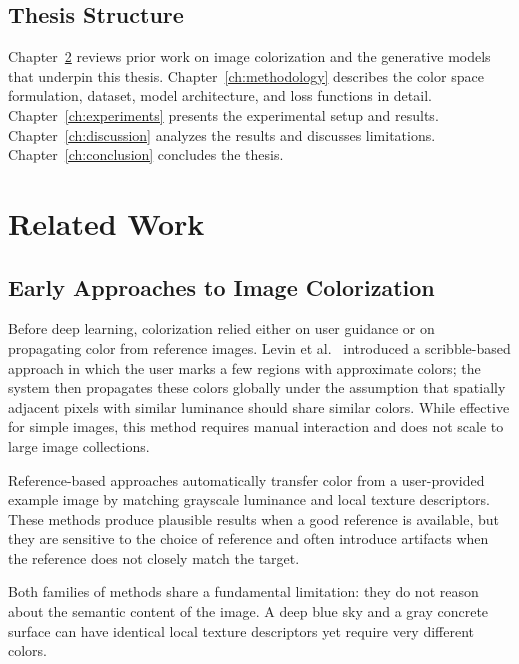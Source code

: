 \documentclass[12pt, a4paper, oneside]{report}
\begin{document}
\section{Thesis Structure}

Chapter~\ref{ch:related} reviews prior work on image colorization and the
generative models that underpin this thesis. Chapter~\ref{ch:methodology} describes
the color space formulation, dataset, model architecture, and loss functions in
detail. Chapter~\ref{ch:experiments} presents the experimental setup and results.
Chapter~\ref{ch:discussion} analyzes the results and discusses limitations.
Chapter~\ref{ch:conclusion} concludes the thesis.


\chapter{Related Work}
\label{ch:related}

\section{Early Approaches to Image Colorization}

Before deep learning, colorization relied either on user guidance or on propagating
color from reference images. Levin et al.\ \cite{levin2004colorization} introduced
a scribble-based approach in which the user marks a few regions with approximate
colors; the system then propagates these colors globally under the assumption that
spatially adjacent pixels with similar luminance should share similar colors. While
effective for simple images, this method requires manual interaction and does not
scale to large image collections.

Reference-based approaches \cite{welsh2002transferring} automatically transfer color
from a user-provided example image by matching grayscale luminance and local texture
descriptors. These methods produce plausible results when a good reference is
available, but they are sensitive to the choice of reference and often introduce
artifacts when the reference does not closely match the target.

Both families of methods share a fundamental limitation: they do not reason about
the semantic content of the image. A deep blue sky and a gray concrete surface can
have identical local texture descriptors yet require very different colors.
\end{document}
